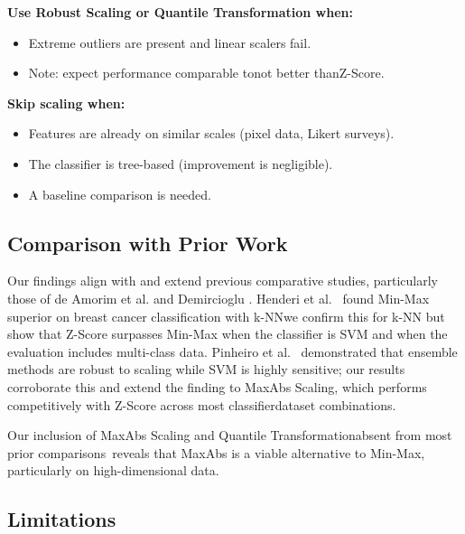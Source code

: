 \documentclass[12pt,a4paper]{article}
\begin{document}
\textbf{Use Robust Scaling or Quantile Transformation when:}
\begin{itemize}
  \item Extreme outliers are present and linear scalers fail.
  \item Note: expect performance comparable to\textemdash not better than\textemdash Z-Score.
\end{itemize}

\textbf{Skip scaling when:}
\begin{itemize}
  \item Features are already on similar scales (pixel data, Likert surveys).
  \item The classifier is tree-based (improvement is negligible).
  \item A baseline comparison is needed.
\end{itemize}

\subsection{Comparison with Prior Work}
\label{sec:comparison}

Our findings align with and extend previous comparative studies, particularly those of de Amorim et al. \cite{amorim2023scaling} and Demircioglu \cite{demircioglu2024normalization}. Henderi et al.~\cite{henderi2021minmax} found Min-Max superior on breast cancer classification with k-NN\textemdash we confirm this for k-NN but show that Z-Score surpasses Min-Max when the classifier is SVM and when the evaluation includes multi-class data. Pinheiro et al.~\cite{pinheiro2025scaling} demonstrated that ensemble methods are robust to scaling while SVM is highly sensitive; our results corroborate this and extend the finding to MaxAbs Scaling, which performs competitively with Z-Score across most classifier\textendash dataset combinations.

Our inclusion of MaxAbs Scaling and Quantile Transformation\textemdash absent from most prior comparisons~\cite{pagan2023scaling,henderi2021minmax,firmansyah2024stroke,pristyanto2022diabetes}\textemdash reveals that MaxAbs is a viable alternative to Min-Max, particularly on high-dimensional data.

\subsection{Limitations}
\label{sec:limitations}
\end{document}

